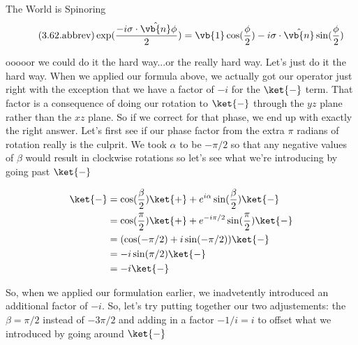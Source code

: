 \begin{answer}
\begin{answerpart}{The World is Spinoring}
    \begin{equation}
      \tag{3.62.abbrev}
      \exp(\frac{-i\sigma\cdot\hat{\vb{n}}\phi}{2})
      = \vb{1}\cos(\frac{\phi}{2})
      - i\sigma\cdot\hat{\vb{n}}\sin(\frac{\phi}{2})
    \end{equation}

    ooooor we could do it the hard way...or the really hard way.
    Let's just do it the hard way.  When we applied our formula above,
    we actually got our operator just right with the exception that we
    have a factor of $-i$ for the $\ket{-}$ term.  That factor is a
    consequence of doing our rotation to $\ket{-}$ through the $yz$
    plane rather than the $xz$ plane.  So if we correct for that
    phase, we end up with exactly the right answer.  Let's first see
    if our phase factor from the extra $\pi$ radians of rotation
    really is the culprit.  We took $\alpha$ to be $-\pi/2$ so that
    any negative values of $\beta$ would result in clockwise rotations
    so let's see what we're introducing by going past $\ket{-}$

    \begin{equation}
      \begin{split}
        \ket{-}
        &= \cos(\frac{\beta}{2})\ket{+}
        +  e^{i\alpha}\sin(\frac{\beta}{2})\ket{-}
        \\
        &= \cos(\frac{\pi}{2})\ket{+}
        +  e^{-i\pi/2}\sin(\frac{\pi}{2})\ket{-}
        \\
        &= (\cos(-\pi/2) + i\sin(-\pi/2))\ket{-}
        \\
        &= -i\sin(\pi/2)\ket{-}
        \\
        &= -i\ket{-}
        \\
      \end{split}
    \end{equation}

    So, when we applied our formulation earlier, we inadvetently
    introduced an additional factor of $-i$.  So, let's try putting
    together our two adjustements: the $\beta=\pi/2$ instead of
    $-3\pi/2$ and adding in a factor $-1/i = i$ to offset what we
    introduced by going around $\ket{-}$


\end{answerpart}
\end{answer}
